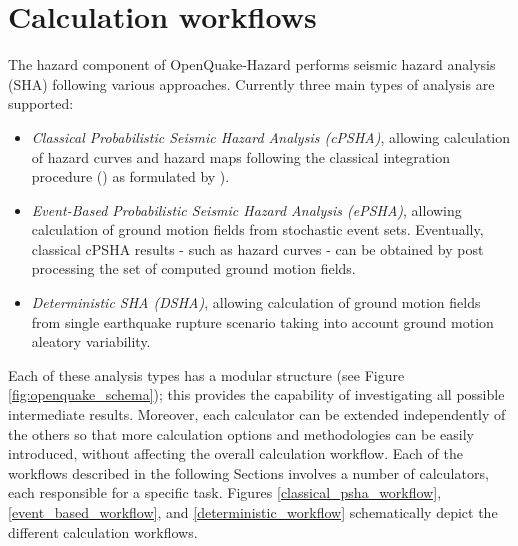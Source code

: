\section{Calculation workflows}
The hazard component of OpenQuake-Hazard performs seismic hazard 
analysis (SHA) following various approaches. 
%
Currently three main types of analysis are supported:
\begin{itemize}
\item \textit{Classical Probabilistic Seismic Hazard Analysis (cPSHA)}, 
allowing calculation of hazard curves and hazard maps following the 
classical integration procedure 
(\cite{cornell1968}) as formulated by \cite{field2003}).
\item \textit{Event-Based Probabilistic Seismic Hazard Analysis (ePSHA)}, 
allowing calculation of ground motion fields from stochastic event sets. 
Eventually, classical cPSHA results - such as hazard curves - can be 
obtained by post processing the set of computed ground motion fields.
\item \textit{Deterministic SHA (DSHA)}, allowing calculation of ground 
motion fields from single earthquake rupture scenario taking into account 
ground motion aleatory variability.
\end{itemize}
Each of these analysis types has a modular structure (see Figure 
\ref{fig:openquake_schema}); this provides the capability of investigating 
all possible intermediate results. Moreover, each calculator can be 
extended independently of the others so that more calculation 
options and methodologies can be easily introduced, without affecting the 
overall calculation workflow. 
Each of the workflows described in the following Sections involves a number 
of calculators, each responsible for a specific task. 
Figures \ref{classical_psha_workflow}, \ref{event_based_workflow}, and 
\ref{deterministic_workflow} schematically depict the different calculation 
workflows.
%
